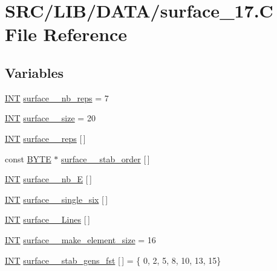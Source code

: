 \hypertarget{surface__17_8_c}{}\section{S\+R\+C/\+L\+I\+B/\+D\+A\+T\+A/surface\+\_\+17.C File Reference}
\label{surface__17_8_c}
\subsection*{Variables}
\begin{DoxyCompactItemize}
\item 
\mbox{\hyperlink{galois_8h_a09fddde158a3a20bd2dcadb609de11dc}{I\+NT}} \mbox{\hyperlink{surface__17_8_c_afd649f13ef06aaad5d31151a1cb57079}{surface\+\_\+\_\+nb\+\_\+reps}} = 7
\item 
\mbox{\hyperlink{galois_8h_a09fddde158a3a20bd2dcadb609de11dc}{I\+NT}} \mbox{\hyperlink{surface__17_8_c_a57b30432c4172b3ed1f21e8a8bd1e16c}{surface\+\_\+\_\+size}} = 20
\item 
\mbox{\hyperlink{galois_8h_a09fddde158a3a20bd2dcadb609de11dc}{I\+NT}} \mbox{\hyperlink{surface__17_8_c_a536bb1e15148d0564a3b3fd4e1e3e0ea}{surface\+\_\+\_\+reps}} \mbox{[}$\,$\mbox{]}
\item 
const \mbox{\hyperlink{galois_8h_ab6cc7b4aeb6ea31aba2b3fbfc83ff5e6}{B\+Y\+TE}} $\ast$ \mbox{\hyperlink{surface__17_8_c_aad762a13f2c7bcf8d1aae30c9306f097}{surface\+\_\+\_\+stab\+\_\+order}} \mbox{[}$\,$\mbox{]}
\item 
\mbox{\hyperlink{galois_8h_a09fddde158a3a20bd2dcadb609de11dc}{I\+NT}} \mbox{\hyperlink{surface__17_8_c_ac5621c3688771126cecbd0b62106dbb9}{surface\+\_\+\_\+nb\+\_\+E}} \mbox{[}$\,$\mbox{]}
\item 
\mbox{\hyperlink{galois_8h_a09fddde158a3a20bd2dcadb609de11dc}{I\+NT}} \mbox{\hyperlink{surface__17_8_c_a3b73ecf497758fc79995205bcfc46732}{surface\+\_\+\_\+single\+\_\+six}} \mbox{[}$\,$\mbox{]}
\item 
\mbox{\hyperlink{galois_8h_a09fddde158a3a20bd2dcadb609de11dc}{I\+NT}} \mbox{\hyperlink{surface__17_8_c_aa4b0d9f184ca1be08d0211a000e4ce91}{surface\+\_\+\_\+\+Lines}} \mbox{[}$\,$\mbox{]}
\item 
\mbox{\hyperlink{galois_8h_a09fddde158a3a20bd2dcadb609de11dc}{I\+NT}} \mbox{\hyperlink{surface__17_8_c_afca98fcd3a0340b12d98fcd6a7f6152e}{surface\+\_\+\_\+make\+\_\+element\+\_\+size}} = 16
\item 
\mbox{\hyperlink{galois_8h_a09fddde158a3a20bd2dcadb609de11dc}{I\+NT}} \mbox{\hyperlink{surface__17_8_c_a2c0e77eb3c9a928c30488bc6fbac47a7}{surface\+\_\+\_\+stab\+\_\+gens\+\_\+fst}} \mbox{[}$\,$\mbox{]} = \{ 0, 2, 5, 8, 10, 13, 15\}

\end{DoxyCompactItemize}
